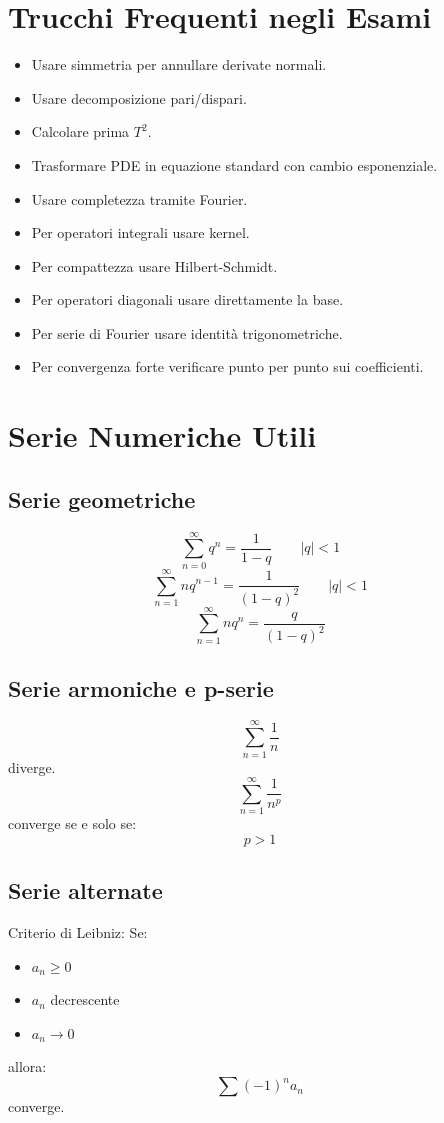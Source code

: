 \documentclass[a4paper,10pt]{article}
\begin{document}
\section{Trucchi Frequenti negli Esami}
\begin{itemize}
\item Usare simmetria per annullare derivate normali.
\item Usare decomposizione pari/dispari.
\item Calcolare prima $T^2$.
\item Trasformare PDE in equazione standard con cambio esponenziale.
\item Usare completezza tramite Fourier.
\item Per operatori integrali usare kernel.
\item Per compattezza usare Hilbert-Schmidt.
\item Per operatori diagonali usare direttamente la base.
\item Per serie di Fourier usare identità trigonometriche.
\item Per convergenza forte verificare punto per punto sui coefficienti.
\end{itemize}

\section{Serie Numeriche Utili}
\subsection{Serie geometriche}
\[\sum_{n=0}^{\infty} q^n = \frac{1}{1-q}
\qquad |q|<1\]
\[\sum_{n=1}^{\infty} nq^{n-1}=\frac{1}{(1-q)^2}
\qquad |q|<1\]
\[\sum_{n=1}^{\infty} nq^n=\frac{q}{(1-q)^2}\]
\subsection{Serie armoniche e p-serie}
\[\sum_{n=1}^{\infty}\frac1n\]
diverge.
\[\sum_{n=1}^{\infty}\frac1{n^p}\]
converge se e solo se:
\[p>1\]
\subsection{Serie alternate}
Criterio di Leibniz:
Se:
\begin{itemize}
\item $a_n\ge0$
\item $a_n$ decrescente
\item $a_n\to0$
\end{itemize}
allora:
\[\sum (-1)^n a_n\]
converge.
\end{document}
